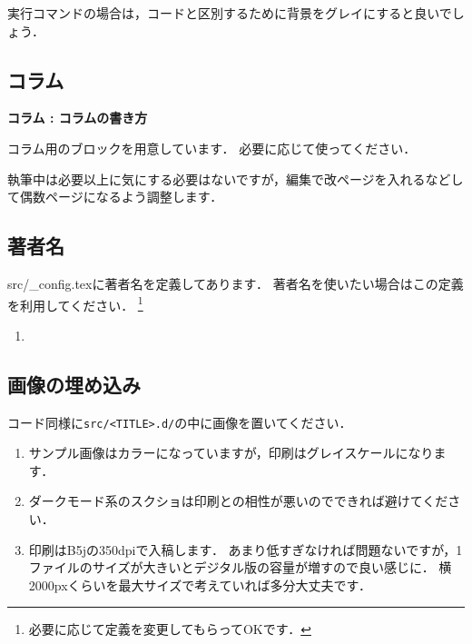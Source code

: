 

実行コマンドの場合は，コードと区別するために背景をグレイにすると良いでしょう．





\subsection{コラム}

\begin{columnbox}
  \textbf{コラム : コラムの書き方}

  コラム用のブロックを用意しています．
  必要に応じて使ってください．
\end{columnbox}

執筆中は必要以上に気にする必要はないですが，編集で改ページを入れるなどして偶数ページになるよう調整します．

\subsection{著者名}

\begin{flushright}
  \authorExample
\end{flushright}

src/\_config.texに著者名を定義してあります．
著者名を使いたい場合はこの定義を利用してください．
\footnote{必要に応じて定義を変更してもらってOKです．}

\begin{enumerate}
  \item \authorExample{}
\end{enumerate}

\subsection{画像の埋め込み}

コード同様に\lstinline{src/<TITLE>.d/}の中に画像を置いてください．


\begin{enumerate}
  \item サンプル画像はカラーになっていますが，印刷はグレイスケールになります．
  \item ダークモード系のスクショは印刷との相性が悪いのでできれば避けてください．
  \item 印刷はB5jの350dpiで入稿します．
    あまり低すぎなければ問題ないですが，1ファイルのサイズが大きいとデジタル版の容量が増すので良い感じに．
    横2000pxくらいを最大サイズで考えていれば多分大丈夫です．
\end{enumerate}
